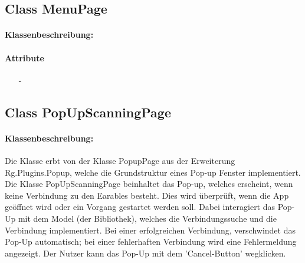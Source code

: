 \documentclass[a4paper,12pt]{article}
\begin{document}
	\subsection{Class MenuPage}
		\paragraph{Klassenbeschreibung:}
		\paragraph{Attribute}
		\begin{itemize}
			\item [-]
		\end{itemize}

	\subsection{Class PopUpScanningPage}
		\paragraph{Klassenbeschreibung:}
		Die Klasse erbt von der Klasse PopupPage aus der Erweiterung \Gls{Rg.Plugins.Popup}, welche die Grundstruktur eines Pop-up Fenster implementiert.\\
		Die Klasse PopUpScanningPage beinhaltet das Pop-up, welches erscheint, wenn keine Verbindung zu den \gls{Earables} besteht. Dies wird überprüft, wenn die App geöffnet wird oder ein Vorgang gestartet werden soll. Dabei interagiert das Pop-Up mit dem Model (der Bibliothek), welches die Verbindungssuche und die Verbindung implementiert. Bei einer erfolgreichen Verbindung, verschwindet das Pop-Up automatisch; bei einer fehlerhaften Verbindung wird eine Fehlermeldung angezeigt. Der Nutzer kann das Pop-Up mit dem 'Cancel-Button' wegklicken. 
\end{document}
